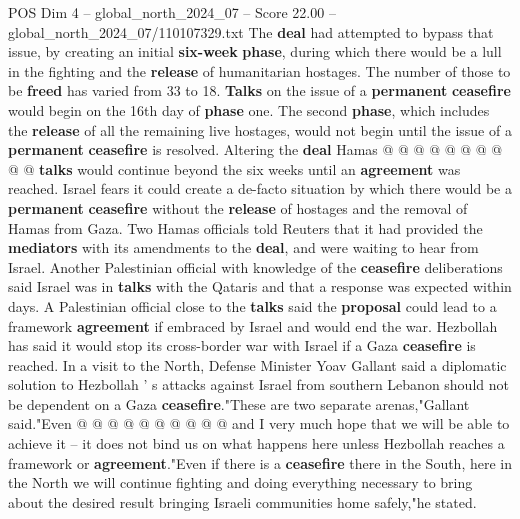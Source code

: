 \begin{textsample}{POS Dim 4 – global\_north\_2024\_07 – Score 22.00 – global\_north\_2024\_07/110107329.txt}
The \textbf{deal} had attempted to bypass that issue, by creating an initial \textbf{six-week} \textbf{phase}, during which there would be a lull in the fighting and the \textbf{release} of humanitarian hostages.
The number of those to be \textbf{freed} has varied from 33 to 18. \textbf{Talks} on the issue of a \textbf{permanent} \textbf{ceasefire} would begin on the 16th day of \textbf{phase} one.
The second \textbf{phase}, which includes the \textbf{release} of all the remaining live hostages, would not begin until the issue of a \textbf{permanent} \textbf{ceasefire} is resolved.
Altering the \textbf{deal} Hamas @ @ @ @ @ @ @ @ @ @ \textbf{talks} would continue beyond the six weeks until an \textbf{agreement} was reached.
Israel fears it could create a de-facto situation by which there would be a \textbf{permanent} \textbf{ceasefire} without the \textbf{release} of hostages and the removal of Hamas from Gaza.
Two Hamas officials told Reuters that it had provided the \textbf{mediators} with its amendments to the \textbf{deal}, and were waiting to hear from Israel.
Another Palestinian official with knowledge of the \textbf{ceasefire} deliberations said Israel was in \textbf{talks} with the Qataris and that a response was expected within days.
A Palestinian official close to the \textbf{talks} said the \textbf{proposal} could lead to a framework \textbf{agreement} if embraced by Israel and would end the war.
Hezbollah has said it would stop its cross-border war with Israel if a Gaza \textbf{ceasefire} is reached.
In a visit to the North, Defense Minister Yoav Gallant said a diplomatic solution to Hezbollah ' s attacks against Israel from southern Lebanon should not be dependent on a Gaza \textbf{ceasefire}."These are two separate arenas,"Gallant said."Even @ @ @ @ @ @ @ @ @ @ and I very much hope that we will be able to achieve it -- it does not bind us on what happens here unless Hezbollah reaches a framework or \textbf{agreement}."Even if there is a \textbf{ceasefire} there in the South, here in the North we will continue fighting and doing everything necessary to bring about the desired result bringing Israeli communities home safely,"he stated.

\end{textsample}
